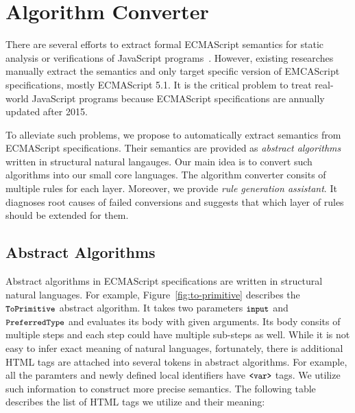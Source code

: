 \section{Algorithm Converter}

There are several efforts to extract formal ECMAScript semantics for static analysis
or verifications of JavaScript programs~\cite{???}. However, existing researches
manually extract the semantics and only target specific version of
EMCAScript specifications, mostly ECMAScript 5.1.
It is the critical problem to treat real-world JavaScript programs
because ECMAScript specifications are annually updated after 2015.

To alleviate such problems, we propose to automatically extract semantics from
ECMAScript specifications. Their semantics are provided as \textit{abstract algorithms}
written in structural natural langauges. Our main idea is to convert such algorithms
into our small core languages. The algorithm converter consits of multiple rules
for each layer. Moreover, we provide \textit{rule generation assistant}.
It diagnoses root causes of failed conversions and suggests
that which layer of rules should be extended for them.

\subsection{Abstract Algorithms}

Abstract algorithms in ECMAScript specifications are written in structural
natural languages. For example, Figure~\ref{fig:to-primitive} describes
the \( \texttt{\small ToPrimitive} \) abstract algorithm. It takes two parameters
\( \texttt{\small input} \) and \( \texttt{\small PreferredType} \) and evaluates its body
with given arguments. Its body consits of multiple steps and each step could
have multiple sub-steps as well. While it is not easy to infer exact meaning
of natural languages, fortunately, there is additional HTML tags are attached
into several tokens in abstract algorithms. For example, all the paramters
and newly defined local identifiers have \( \texttt{\small<var>} \) tags.
We utilize such information to construct more precise semantics.
The following table describes the list of HTML tags we utilize
and their meaning:

